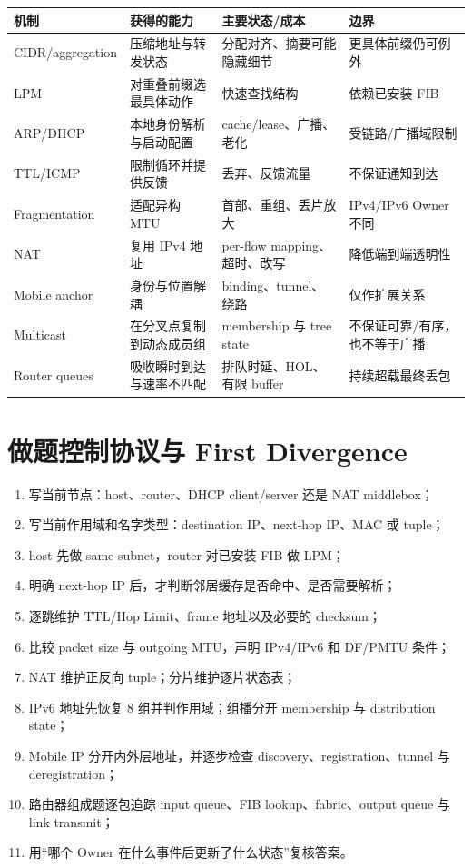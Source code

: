 \documentclass[11pt,a4paper]{ctexart}
\begin{document}
\begin{center}
\small
\begin{tabularx}{\linewidth}{L{2.4cm}Y Y Y}
\toprule
机制 & 获得的能力 & 主要状态/成本 & 边界\\
\midrule
CIDR/aggregation & 压缩地址与转发状态 & 分配对齐、摘要可能隐藏细节 & 更具体前缀仍可例外\\
LPM & 对重叠前缀选最具体动作 & 快速查找结构 & 依赖已安装 FIB\\
ARP/DHCP & 本地身份解析与启动配置 & cache/lease、广播、老化 & 受链路/广播域限制\\
TTL/ICMP & 限制循环并提供反馈 & 丢弃、反馈流量 & 不保证通知到达\\
Fragmentation & 适配异构 MTU & 首部、重组、丢片放大 & IPv4/IPv6 Owner 不同\\
NAT & 复用 IPv4 地址 & per-flow mapping、超时、改写 & 降低端到端透明性\\
Mobile anchor & 身份与位置解耦 & binding、tunnel、绕路 & 仅作扩展关系\\
Multicast & 在分叉点复制到动态成员组 & membership 与 tree state & 不保证可靠/有序，也不等于广播\\
Router queues & 吸收瞬时到达与速率不匹配 & 排队时延、HOL、有限 buffer & 持续超载最终丢包\\
\bottomrule
\end{tabularx}
\end{center}

\section{做题控制协议与 First Divergence}

\begin{enumerate}
  \item 写当前节点：host、router、DHCP client/server 还是 NAT middlebox；
  \item 写当前作用域和名字类型：destination IP、next-hop IP、MAC 或 tuple；
  \item host 先做 same-subnet，router 对已安装 FIB 做 LPM；
  \item 明确 next-hop IP 后，才判断邻居缓存是否命中、是否需要解析；
  \item 逐跳维护 TTL/Hop Limit、frame 地址以及必要的 checksum；
  \item 比较 packet size 与 outgoing MTU，声明 IPv4/IPv6 和 DF/PMTU 条件；
  \item NAT 维护正反向 tuple；分片维护逐片状态表；
  \item IPv6 地址先恢复 8 组并判作用域；组播分开 membership 与 distribution state；
  \item Mobile IP 分开内外层地址，并逐步检查 discovery、registration、tunnel 与 deregistration；
  \item 路由器组成题逐包追踪 input queue、FIB lookup、fabric、output queue 与 link transmit；
  \item 用“哪个 Owner 在什么事件后更新了什么状态”复核答案。
\end{enumerate}
\end{document}
